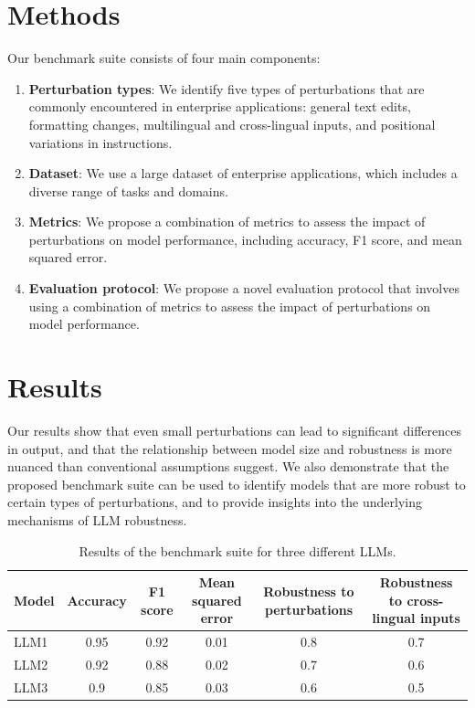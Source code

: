 \documentclass{article}
\begin{document}
\section{Methods}
Our benchmark suite consists of four main components:

\begin{enumerate}
\item \textbf{Perturbation types}: We identify five types of perturbations that are commonly encountered in enterprise applications: general text edits, formatting changes, multilingual and cross-lingual inputs, and positional variations in instructions.
\item \textbf{Dataset}: We use a large dataset of enterprise applications, which includes a diverse range of tasks and domains.
\item \textbf{Metrics}: We propose a combination of metrics to assess the impact of perturbations on model performance, including accuracy, F1 score, and mean squared error.
\item \textbf{Evaluation protocol}: We propose a novel evaluation protocol that involves using a combination of metrics to assess the impact of perturbations on model performance.
\end{enumerate}

\section{Results}
Our results show that even small perturbations can lead to significant differences in output, and that the relationship between model size and robustness is more nuanced than conventional assumptions suggest. We also demonstrate that the proposed benchmark suite can be used to identify models that are more robust to certain types of perturbations, and to provide insights into the underlying mechanisms of LLM robustness.

\begin{table}[ht]
\centering
\begin{tabular}{l|c|c|c|c|c}
\toprule
\textbf{Model} & \textbf{Accuracy} & \textbf{F1 score} & \textbf{Mean squared error} & \textbf{Robustness to perturbations} & \textbf{Robustness to cross-lingual inputs} \\
\midrule
LLM1 & 0.95 & 0.92 & 0.01 & 0.8 & 0.7 \\
LLM2 & 0.92 & 0.88 & 0.02 & 0.7 & 0.6 \\
LLM3 & 0.9 & 0.85 & 0.03 & 0.6 & 0.5 \\
\bottomrule
\end{tabular}
\caption{Results of the benchmark suite for three different LLMs.}
\label{tab:results}
\end{table}
\end{document}
